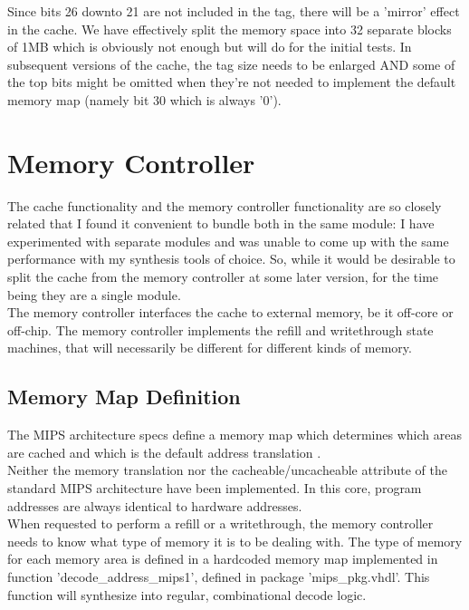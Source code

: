     Since bits 26 downto 21 are not included in the tag, there will be a 
    'mirror' effect in the cache. We have effectively split the memory space 
    into 32 separate blocks of 1MB which is obviously not enough but will do
    for the initial tests.
    In subsequent versions of the cache, the tag size needs to be enlarged AND 
    some of the top bits might be omitted when they're not needed to implement 
    the default memory map (namely bit 30 which is always '0').

    
\section{Memory Controller}
\label{memory_controller}

    The cache functionality and the memory controller functionality are so 
    closely related that I found it convenient to bundle both in the same 
    module: I have experimented with separate modules and was unable to come up
    with the same performance with my synthesis tools of choice.
    So, while it would be desirable to split the cache from the memory controller
    at some later version, for the time being they are a single module.\\

    The memory controller interfaces the cache to external memory, be it off-core 
    or off-chip.
    The memory controller implements the refill and writethrough state machines,
    that will necessarily be different for different kinds of memory.\\


\subsection{Memory Map Definition}
\label{memory_map_definition}    
    
    The MIPS architecture specs define a memory map which determines which areas
    are cached and which is the default address translation \cite[p.~2-8]{r3k_ref_man}.\\
    Neither the memory translation nor the cacheable/uncacheable attribute of
    the standard MIPS architecture have been implemented. In this core, program 
    addresses are always identical to hardware addresses.\\

    When requested to perform a refill or a writethrough, the memory controller 
    needs to know what type of memory it is to be dealing with. The type of
    memory for each memory area is defined in a hardcoded memory map 
    implemented in function 'decode\_address\_mips1', defined in package 
    'mips\_pkg.vhdl'. This function will synthesize into regular, combinational 
    decode logic.\\

